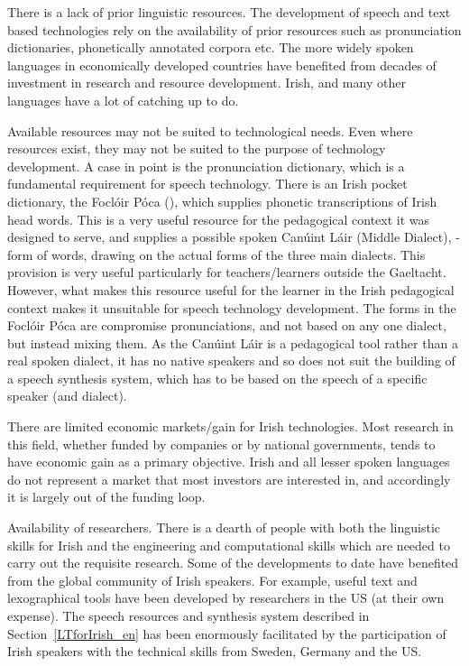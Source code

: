 \begin{multicols}{2}
There is a lack of prior linguistic resources. The development of speech and text based technologies rely on the availability of prior resources such as pronunciation dictionaries, phonetically annotated corpora etc. The more widely spoken languages in economically developed countries have benefited from decades of investment in research and resource development. Irish, and many other languages have a lot of catching up to do.

Available resources may not be suited to technological needs. Even where resources exist, they may not be suited to the purpose of technology development. A case in point is the pronunciation dictionary, which is a fundamental requirement for speech technology. There is an Irish pocket dictionary, the Foclóir Póca (\cite{focloir}), which supplies phonetic transcriptions of Irish head words. This is a very useful resource for the pedagogical context it was designed to serve, and supplies a possible spoken Canúint Láir (Middle Dialect), - form of words, drawing on the actual forms of the three main dialects. This provision is very useful particularly for teachers/learners outside the Gaeltacht. However, what makes this resource useful for the learner in the Irish pedagogical context makes it unsuitable for speech technology development. The forms in the Foclóir Póca are compromise pronunciations, and not based on any one dialect, but instead mixing them. As the Canúint Láir is a pedagogical tool rather than a real spoken dialect, it has no native speakers and so does not suit the building of a speech synthesis system, which has to be based on the speech of a specific speaker (and dialect).

There are limited economic markets/gain for Irish technologies. Most research in this field, whether funded by companies or by national governments, tends to have economic gain as a primary objective.  Irish and all lesser spoken languages do not represent a market that most investors are interested in, and accordingly it is largely out of the funding loop.

Availability of researchers. There is a dearth of people with both the linguistic skills for Irish and the engineering and computational skills which are needed to carry out the requisite research.  Some of the developments to date have benefited from the global community of Irish speakers. For example, useful text and lexographical tools have been developed by researchers in the US (at their own expense). The speech resources and synthesis system described in Section~\ref{LTforIrish_en} has been enormously facilitated by the participation of Irish speakers with the technical skills from Sweden, Germany and the US.


\end{multicols}
